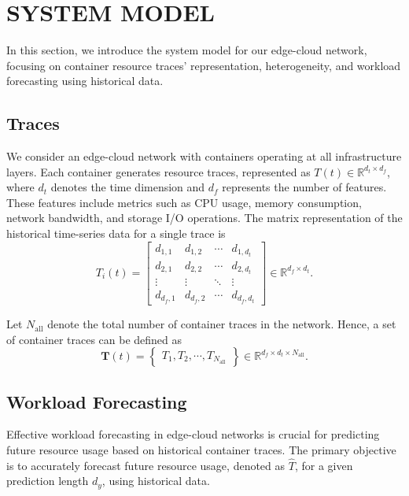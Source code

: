 \section{SYSTEM MODEL}
\label{sec: System Model}

In this section, we introduce the system model for our edge-cloud network, focusing on container resource traces' representation, heterogeneity, and workload forecasting using historical data.

\subsection{Traces}

We consider an edge-cloud network with containers operating at all infrastructure layers. Each container generates resource traces, represented as $T(t) \in \mathbb{R}^{d_t \times d_f}$, where $d_t$ denotes the time dimension and $d_f$ represents the number of features. These features include metrics such as CPU usage, memory consumption, network bandwidth, and storage I/O operations. The matrix representation of the historical time-series data for a single trace is
\begin{equation}
T_i(t) = \begin{bmatrix}
d_{1,1} & d_{1,2} & \cdots & d_{1,d_t} \\
d_{2,1} & d_{2,2} & \cdots & d_{2,d_t} \\
\vdots & \vdots & \ddots & \vdots \\
d_{d_f,1} & d_{d_f,2} & \cdots & d_{d_f,d_t} 
\end{bmatrix} \in \mathbb{R}^{d_f \times d_t}.
\end{equation}

Let \( N_{\text{all}} \) denote the total number of container traces in the network. Hence, a set of container traces can be defined as
\begin{equation}
\mathbf{T}(t) = \begin{Bmatrix} T_1, T_2, \cdots, T_{N_\text{all}} \end{Bmatrix} \in \mathbb{R}^{d_f \times d_t \times N_{\text{all}}}.
\end{equation}

\subsection{Workload Forecasting}

Effective workload forecasting in edge-cloud networks is crucial for predicting future resource usage based on historical container traces. The primary objective is to accurately forecast future resource usage, denoted as $\hat{T}$, for a given prediction length $d_y$, using historical data.

